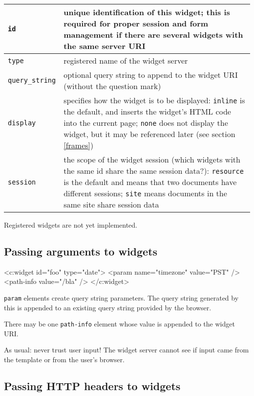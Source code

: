 \documentclass[a4paper,12pt]{article}
\begin{document}
\begin{tabular}{|l|p{8cm}|}
\hline
\texttt{id} & unique identification of this widget; this is required
for proper session and form management if there are several widgets
with the same server URI \\
\hline
\texttt{type} & registered name of the widget server \\
\hline
\texttt{query\_string} & optional query string to append to the widget
URI (without the question mark) \\
\hline

\texttt{display} & specifies how the widget is to be displayed:
\texttt{inline} is the default, and inserts the widget's HTML code
into the current page; \texttt{none} does not display the widget, but
it may be referenced later (see section \ref{frames}) \\

\hline
\texttt{session} & the scope of the widget session (which widgets with
the same id share the same session data?): \texttt{resource} is the
default and means that two documents have different sessions;
\texttt{site} means documents in the same site share session data \\

\hline
\end{tabular}

Registered widgets are not yet implemented.

\subsection{Passing arguments to widgets}

\begin{verbatim*}
<c:widget id="foo" type="date">
  <param name="timezone" value="PST" />
  <path-info value="/bla" />
</c:widget>
\end{verbatim*}

\texttt{param} elements create query string parameters.  The query
string generated by this is appended to an existing query string
provided by the browser.

There may be one \texttt{path-info} element whose value is appended to
the widget URI.

As usual: never trust user input!  The widget server cannot see if
input came from the template or from the user's browser.

\subsection{Passing HTTP headers to widgets}
\end{document}
